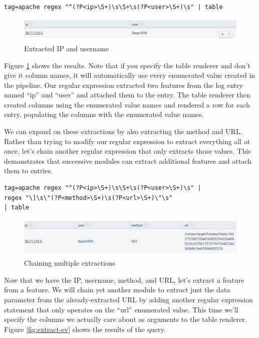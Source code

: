 \begin{Verbatim}[breaklines=true]
tag=apache regex "^(?P<ip>\S+)\s\S+\s(?P<user>\S+)\s" | table
\end{Verbatim}

\begin{figure}
	\includegraphics[width=0.8\linewidth]{images/extract-ip.png}
	\caption{Extracted IP and username}
	\label{fig:extract-ip}
\end{figure}

Figure \ref{fig:extract-ip} shows the results.
Note that if you specify the table renderer and don't give it column
names, it will automatically use every enumerated value created in the
pipeline. Our regular expression extracted two features from the log
entry named ``ip'' and ``user'' and attached them to the entry. The
table renderer then created columns using the enumerated value names
and rendered a row for each entry, populating the columns with the
enumerated value names.

We can expand on these extractions by also extracting the method and
URL. Rather than trying to modify our regular expression to extract
everything all at once, let's chain another regular expression that only
extracts those values. This demonstrates that successive modules can
extract additional features and attach them to entries.

\begin{Verbatim}[breaklines=true]
tag=apache regex "^(?P<ip>\S+)\s\S+\s(?P<user>\S+)\s" |
regex "\]\s\"(?P<method>\S+)\s(?P<url>\S+)\"\s"
| table
\end{Verbatim}

\begin{figure}
	\includegraphics[width=0.8\linewidth]{images/extract-chaining.png}
	\caption{Chaining multiple extractions}
	\label{fig:extract-chaining}
\end{figure}

Now that we have the IP, username, method, and URL, let's extract a
feature from a feature. We will chain yet another module to extract
just the data parameter from the already-extracted URL by adding another
regular expression statement that only operates on the ``url''
enumerated value. This time we'll specify the columns we actually care
about as arguments to the table renderer. Figure \ref{fig:extract-ev} shows
the results of the query.

